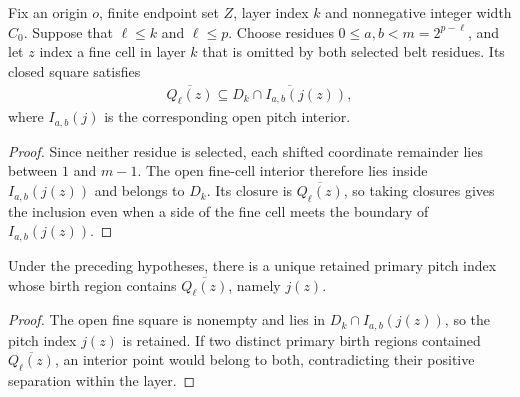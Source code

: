 \begin{lemma}
    \label{thm:area_law_nonbelt_primary_containment}
    \leanok
    Fix an origin $o$, finite endpoint set $Z$, layer index $k$ and
    nonnegative integer width $C_0$. Suppose that $\ell\le k$ and
    $\ell\le p$. Choose residues $0\le a,b<m=2^{p-\ell}$, and let $z$
    index a fine cell in layer $k$ that is omitted by both
    selected belt residues. Its closed square satisfies
    \begin{align}
        \overline{Q_\ell(z)}\subseteq
        \overline{D_k\cap I_{a,b}(j(z))},
    \end{align}
    where $I_{a,b}(j)$ is the corresponding open pitch interior.
\end{lemma}
\begin{proof}\leanok
    Since neither residue is selected, each shifted coordinate remainder
    lies between $1$ and $m-1$. The open fine-cell interior therefore
    lies inside $I_{a,b}(j(z))$ and belongs to $D_k$.
    Its closure is $\overline{Q_\ell(z)}$, so taking closures gives the
    inclusion even when a side of the fine cell meets the boundary of $I_{a,b}(j(z))$.
\end{proof}

\begin{lemma}
    \label{thm:area_law_nonbelt_unique_primary}
    \leanok
    Under the preceding hypotheses, there is a unique retained
    primary pitch index whose birth region contains $\overline{Q_\ell(z)}$,
    namely $j(z)$.
\end{lemma}
\begin{proof}\leanok
    The open fine square is nonempty and lies in $D_k\cap I_{a,b}(j(z))$,
    so the pitch index $j(z)$ is retained.
    If two distinct primary birth regions contained $\overline{Q_\ell(z)}$,
    an interior point would belong to both, contradicting their positive
    separation within the layer.
\end{proof}

